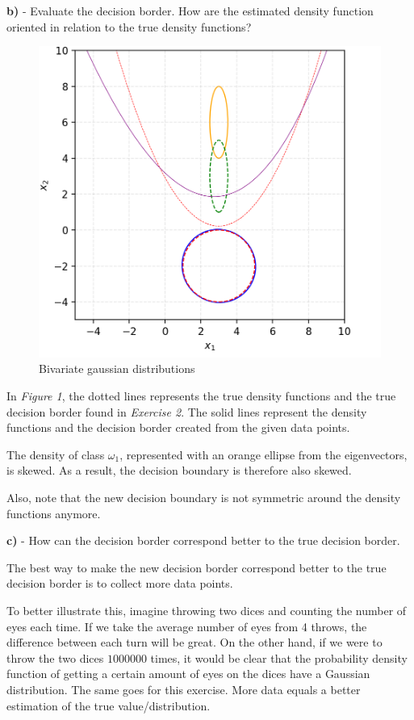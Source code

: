 \documentclass{homeworg}
\begin{document}
\bigskip
\newpage
\textbf{b)} - Evaluate the decision border. How are the estimated density function oriented in relation to the true density functions?
\smallskip
\bigskip

\begin{figure}[H]
    \centering
        \includegraphics[scale=1]{bivariategaussian.png}
    \caption{Bivariate gaussian distributions}
\end{figure}

In \textit{Figure 1}, the dotted lines represents the true density functions and the true decision border found in \textit{Exercise 2}. 
The solid lines represent the density functions and the decision border created from the given data points.

The density of class $\omega_1$, represented with an orange ellipse from the eigenvectors, is skewed. As a result, the decision boundary is therefore also skewed.

Also, note that the new decision boundary is not symmetric around the density functions anymore.


\bigskip
\textbf{c)} - How can the decision border correspond better to the true decision border.
\smallskip
\bigskip

The best way to make the new decision border correspond better to the true decision border is to collect more data points. 

To better illustrate this, imagine throwing two dices and counting the number of eyes each time. If we take the average number of eyes from 4 throws, the difference between each turn will be great.
On the other hand, if we were to throw the two dices $1000000$ times, it would be clear that the probability density function of getting a certain amount of eyes on the dices have a Gaussian distribution.
The same goes for this exercise. More data equals a better estimation of the true value/distribution.
\end{document}
